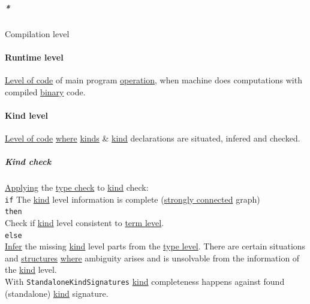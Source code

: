 \documentclass[11pt]{article}
\begin{document}
\subparagraph{\emph{*}}
\label{sec:org79fd129}

\label{org285a62d}Compilation level\\

\paragraph{\label{org36571bd}Runtime level}
\label{sec:org4cbeac2}
\hyperref[org6ffbfd4]{Level of code} of main program \hyperref[org1173fe8]{operation}, when machine does computations with compiled \hyperref[org57bd48f]{binary} code.\\

\paragraph{\label{orgf6693fa}Kind level}
\label{sec:orgc84751c}
\hyperref[org6ffbfd4]{Level of code} \hyperref[org3e5903d]{where} \hyperref[org6ff3066]{kinds} \& \hyperref[orgd0eb143]{kind} declarations are situated, infered and checked.\\

\subparagraph{\label{orgf1aee3b}Kind check}
\label{sec:orgdf4044d}
\hyperref[org6b37c0b]{Applying} the \hyperref[orgf9abc5e]{type check} to \hyperref[orgd0eb143]{kind} check:\\

\texttt{if} The \hyperref[orgd0eb143]{kind} level information is complete (\hyperref[org9753e4e]{strongly connected} graph)\\

\texttt{then}\\

Check if \hyperref[orgd0eb143]{kind} level consistent to \hyperref[org4d02774]{term level}.\\

\texttt{else}\\

\hyperref[org6da926a]{Infer} the missing \hyperref[orgd0eb143]{kind} level parts from the \hyperref[orgfe4cf3f]{type level}. There are certain situations and \hyperref[orgc87c48c]{structures} \hyperref[org3e5903d]{where} ambiguity arises and is unsolvable from the information of the \hyperref[orgd0eb143]{kind} level.\\

With \texttt{StandaloneKindSignatures} \hyperref[orgd0eb143]{kind} completeness happens against found (standalone) \hyperref[orgd0eb143]{kind} signature.\\
\end{document}
